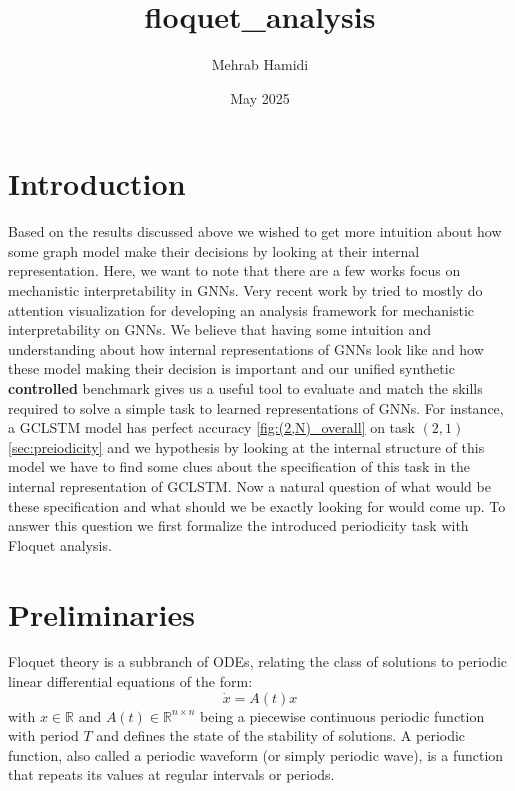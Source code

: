 \documentclass{article}
\title{floquet_analysis}
\author{Mehrab Hamidi}
\date{May 2025}
\theoremstyle{remark}
\theoremstyle{definition}
\begin{document}
\section{Introduction}

Based on the results discussed above we wished to get more intuition about how some graph model make their decisions by looking at their internal representation. Here, we want to note that there are a few works focus on mechanistic interpretability in GNNs. Very recent work by \citep{el2025towards} tried to mostly do attention visualization for developing an analysis framework for mechanistic interpretability on GNNs. 
We believe that having some intuition and understanding about how internal representations of GNNs look like and how these model making their decision is important and our unified synthetic \textbf{controlled} benchmark gives us a useful tool to evaluate and match the skills required to solve a simple task to learned representations of GNNs. For instance, a GCLSTM model has perfect accuracy \ref{fig:(2,N)_overall} on task $(2, 1)$ \ref{sec:preiodicity} and we hypothesis by looking at the internal structure of this model we have to find some clues about the specification of this task in the internal representation of GCLSTM. Now a natural question of what would be these specification and what should we be exactly looking for would come up. To answer this question we first formalize the introduced periodicity task with Floquet analysis.

\section{Preliminaries}
Floquet theory is a subbranch of ODEs, relating the class of solutions to periodic linear differential equations of the form:
$$
\dot{x} = A(t) x
$$
with $x \in \mathbb{R}$ and $A(t) \in \mathbb{R}^{n\times n}$ being a piecewise continuous periodic function with period $T$ and defines the state of the stability of solutions. A periodic function, also called a periodic waveform (or simply periodic wave), is a function that repeats its values at regular intervals or periods. 
\end{document}
